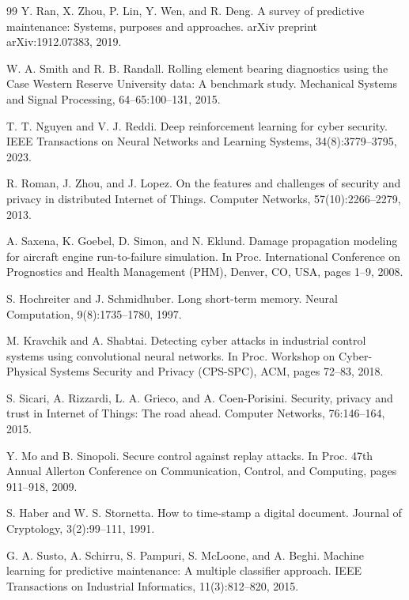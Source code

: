 \begin{thebibliography}{99}
 Y. Ran, X. Zhou, P. Lin, Y. Wen, and R. Deng. A survey of predictive maintenance: Systems, purposes and approaches. arXiv preprint arXiv:1912.07383, 2019.

 W. A. Smith and R. B. Randall. Rolling element bearing diagnostics using the Case Western Reserve University data: A benchmark study. Mechanical Systems and Signal Processing, 64--65:100--131, 2015.

 T. T. Nguyen and V. J. Reddi. Deep reinforcement learning for cyber security. IEEE Transactions on Neural Networks and Learning Systems, 34(8):3779--3795, 2023.

 R. Roman, J. Zhou, and J. Lopez. On the features and challenges of security and privacy in distributed Internet of Things. Computer Networks, 57(10):2266--2279, 2013.

 A. Saxena, K. Goebel, D. Simon, and N. Eklund. Damage propagation modeling for aircraft engine run-to-failure simulation. In Proc. International Conference on Prognostics and Health Management (PHM), Denver, CO, USA, pages 1--9, 2008.

 S. Hochreiter and J. Schmidhuber. Long short-term memory. Neural Computation, 9(8):1735--1780, 1997.

 M. Kravchik and A. Shabtai. Detecting cyber attacks in industrial control systems using convolutional neural networks. In Proc. Workshop on Cyber-Physical Systems Security and Privacy (CPS-SPC), ACM, pages 72--83, 2018.

 S. Sicari, A. Rizzardi, L. A. Grieco, and A. Coen-Porisini. Security, privacy and trust in Internet of Things: The road ahead. Computer Networks, 76:146--164, 2015.

 Y. Mo and B. Sinopoli. Secure control against replay attacks. In Proc. 47th Annual Allerton Conference on Communication, Control, and Computing, pages 911--918, 2009.

 S. Haber and W. S. Stornetta. How to time-stamp a digital document. Journal of Cryptology, 3(2):99--111, 1991.

 G. A. Susto, A. Schirru, S. Pampuri, S. McLoone, and A. Beghi. Machine learning for predictive maintenance: A multiple classifier approach. IEEE Transactions on Industrial Informatics, 11(3):812--820, 2015.


\end{thebibliography}
